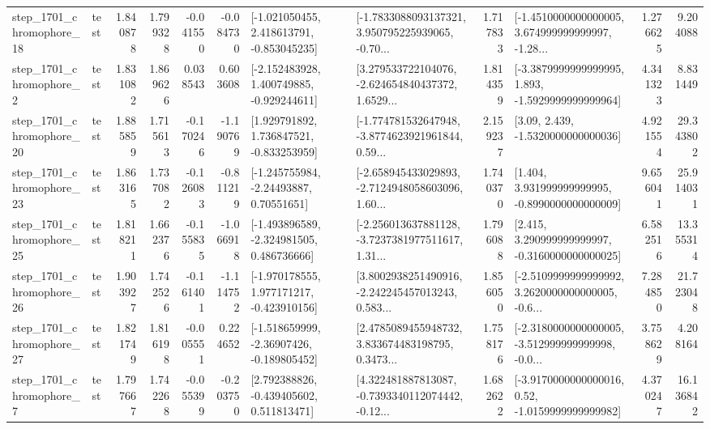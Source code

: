 \begin{tabular}{llrrrrllrlrr}
 step\_1701\_chromophore\_18 &      test &      1.840878 &    1.799328 &     -0.041550 & -0.084730 &   [-1.021050455, 2.418613791, -0.853045235] &  [-1.7833088093137321, 3.950795225939065, -0.70... &       1.717833 &  [-1.4510000000000005, 3.674999999999997, -1.28... &            1.276625 &          9.204088 \\
  step\_1701\_chromophore\_2 &      test &      1.831082 &    1.869626 &      0.038543 &  0.603608 &   [-2.152483928, 1.400749885, -0.929244611] &  [3.279533722104076, -2.624654840437372, 1.6529... &       1.814359 &  [-3.3879999999999995, 1.893, -1.5929999999999964] &            4.341323 &          8.831449 \\
 step\_1701\_chromophore\_20 &      test &      1.885859 &    1.715613 &     -0.170246 & -1.190769 &    [1.929791892, 1.736847521, -0.833253959] &  [-1.774781532647948, -3.8774623921961844, 0.59... &       2.159237 &                 [3.09, 2.439, -1.5320000000000036] &            4.921554 &         29.343802 \\
 step\_1701\_chromophore\_23 &      test &      1.863165 &    1.737082 &     -0.126083 & -0.811219 &     [-1.245755984, -2.24493887, 0.70551651] &  [-2.658945433029893, -2.7124948058603096, 1.60... &       1.740370 &    [1.404, 3.931999999999995, -0.8990000000000009] &            9.656041 &         25.914031 \\
 step\_1701\_chromophore\_25 &      test &      1.818211 &    1.662376 &     -0.155835 & -1.066918 &   [-1.493896589, -2.324981505, 0.486736666] &  [-2.256013637881128, -3.7237381977511617, 1.31... &       1.796088 &    [2.415, 3.290999999999997, -0.3160000000000025] &            6.582516 &         13.355314 \\
 step\_1701\_chromophore\_26 &      test &      1.903927 &    1.742526 &     -0.161401 & -1.114752 &   [-1.970178555, 1.977171217, -0.423910156] &  [3.8002938251490916, -2.242245457013243, 0.583... &       1.856050 &  [-2.5109999999999992, 3.2620000000000005, -0.6... &            7.284850 &         21.723048 \\
 step\_1701\_chromophore\_27 &      test &      1.821749 &    1.816198 &     -0.005551 &  0.224652 &   [-1.518659999, -2.36907426, -0.189805452] &  [2.4785089455948732, 3.833674483198795, 0.3473... &       1.758176 &  [-2.3180000000000005, -3.512999999999998, -0.0... &            3.758629 &          4.208164 \\
  step\_1701\_chromophore\_7 &      test &      1.797667 &    1.742268 &     -0.055399 & -0.203750 &    [2.792388826, -0.439405602, 0.511813471] &  [4.322481887813087, -0.7393340112074442, -0.12... &       1.682622 &   [-3.9170000000000016, 0.52, -1.0159999999999982] &            4.370247 &         16.136842 \\

\end{tabular}
